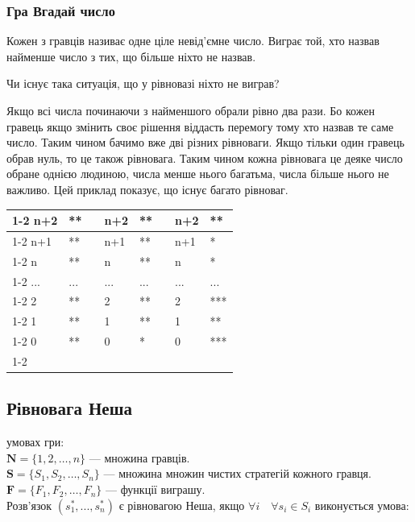 \documentclass[a4paper]{article}
\begin{document}
\subsubsection{Гра Вгадай число}\label{smallest}

Кожен з гравців називає одне ціле невід'ємне число. Виграє той, хто назвав найменше число з тих, що більше ніхто не назвав.

Чи існує така ситуація, що у рівновазі ніхто не виграв?

Якщо всі числа починаючи з найменшого обрали рівно два рази. Бо кожен гравець якщо змінить своє рішення віддасть перемогу тому хто назвав те саме число. Таким чином бачимо вже дві різних рівноваги. Якщо тільки один гравець обрав нуль, то це також рівновага. Таким чином кожна рівновага це деяке число обране однією людиною, числа менше нього багатьма, числа більше нього не важливо.
Цей приклад показує, що існує багато рівноваг.
\begin{table}[h]
\begin{tabular}{|l|l|l|l|l|l|l|l|}
\cline{1-2} \cline{4-5} \cline{7-8}
n+2 & **  &  & n+2 & **  &  & n+2 & **  \\ \cline{1-2} \cline{4-5} \cline{7-8} 
n+1 & **  &  & n+1 & **  &  & n+1 & *   \\ \cline{1-2} \cline{4-5} \cline{7-8} 
n   & **  &  & n   & **  &  & n   & *   \\ \cline{1-2} \cline{4-5} \cline{7-8} 
... & ... &  & ... & ... &  & ... & ... \\ \cline{1-2} \cline{4-5} \cline{7-8} 
2   & **  &  & 2   & **  &  & 2   & *** \\ \cline{1-2} \cline{4-5} \cline{7-8} 
1   & **  &  & 1   & **  &  & 1   & **  \\ \cline{1-2} \cline{4-5} \cline{7-8} 
0   & **  &  & 0   & *   &  & 0   & *** \\ \cline{1-2} \cline{4-5} \cline{7-8} 
\end{tabular}
\end{table}

\subsection{Рівновага Неша}
 умовах гри:\\
$\mathbf {N} =\{1,2,\ldots ,n\}$ — множина гравців.\\
$\mathbf {S} =\{S_{1},S_{2},\ldots ,S_{n}\}$ — множина множин чистих стратегій кожного гравця.\\
$\mathbf {F} =\{F_{1},F_{2},\ldots ,F_{n}\}$ — функції виграшу.\\
Розв'язок $(s_{1}^*,...,s_{n}^*)$ є рівновагою Неша, якщо $\forall i \quad \forall s_{i} \in S_{i}$ виконується умова:
\end{document}
